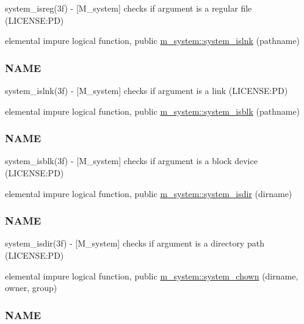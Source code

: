 \begin{DoxyCompactItemize}
\begin{DoxyCompactList}
system\+\_\+isreg(3f) -\/ \mbox{[}M\+\_\+system\mbox{]} checks if argument is a regular file (L\+I\+C\+E\+N\+SE\+:PD) \end{DoxyCompactList}\item 
elemental impure logical function, public \mbox{\hyperlink{namespacem__system_a268d0cd27be36527894fe2cae0f1b9f6}{m\+\_\+system\+::system\+\_\+islnk}} (pathname)
\begin{DoxyCompactList}\small\item\em \subsubsection*{N\+A\+ME}

system\+\_\+islnk(3f) -\/ \mbox{[}M\+\_\+system\mbox{]} checks if argument is a link (L\+I\+C\+E\+N\+SE\+:PD) \end{DoxyCompactList}\item 
elemental impure logical function, public \mbox{\hyperlink{namespacem__system_a1294b8d8b4910261c0a0991bf668ab67}{m\+\_\+system\+::system\+\_\+isblk}} (pathname)
\begin{DoxyCompactList}\small\item\em \subsubsection*{N\+A\+ME}

system\+\_\+isblk(3f) -\/ \mbox{[}M\+\_\+system\mbox{]} checks if argument is a block device (L\+I\+C\+E\+N\+SE\+:PD) \end{DoxyCompactList}\item 
elemental impure logical function, public \mbox{\hyperlink{namespacem__system_a7946ea976f399baff21caebcbe931f6d}{m\+\_\+system\+::system\+\_\+isdir}} (dirname)
\begin{DoxyCompactList}\small\item\em \subsubsection*{N\+A\+ME}

system\+\_\+isdir(3f) -\/ \mbox{[}M\+\_\+system\mbox{]} checks if argument is a directory path (L\+I\+C\+E\+N\+SE\+:PD) \end{DoxyCompactList}\item 
elemental impure logical function, public \mbox{\hyperlink{namespacem__system_ab89e4d2fb219225c374570d4f9d58e9b}{m\+\_\+system\+::system\+\_\+chown}} (dirname, owner, group)
\begin{DoxyCompactList}\small\item\em \subsubsection*{N\+A\+ME}


\end{DoxyCompactList}
\end{DoxyCompactItemize}
